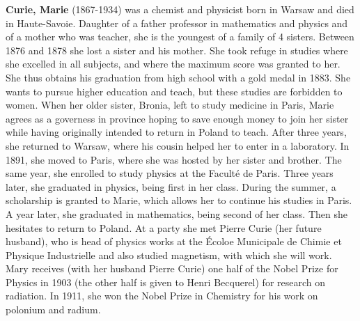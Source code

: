 \textbf{Curie, Marie} (1867-1934) was a chemist and physicist born in Warsaw and died in Haute-Savoie. Daughter of a father professor in mathematics and physics and of a mother who was teacher, she is the youngest of a family of 4 sisters. Between 1876 and 1878 she lost a sister and his mother. She took refuge in studies where she excelled in all subjects, and where the maximum score was granted to her. She thus obtains his graduation from high school with a gold medal in 1883. She wants to pursue higher education and teach, but these studies are forbidden to women. When her older sister, Bronia, left to study medicine in Paris, Marie agrees as a governess in province hoping to save enough money to join her sister while having originally intended to return in Poland to teach. After three years, she returned to Warsaw, where his cousin helped her to enter in a laboratory. In 1891, she moved to Paris, where she was hosted by her sister and brother. The same year, she enrolled to study physics at the Faculté de Paris. Three years later, she graduated in physics, being first in her class. During the summer, a scholarship is granted to Marie, which allows her to continue his studies in Paris. A year later, she graduated in mathematics, being second of her class. Then she hesitates to return to Poland. At a party she met Pierre Curie (her future husband), who is head of physics works at the Écoloe Municipale de Chimie et Physique Industrielle and also studied magnetism, with which she will work. Mary receives (with her husband Pierre Curie) one half of the Nobel Prize for Physics in 1903 (the other half is given to Henri Becquerel) for research on radiation. In 1911, she won the Nobel Prize in Chemistry for his work on polonium and radium.

